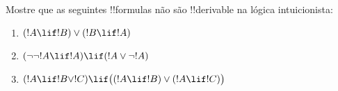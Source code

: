 \documentclass[../../../include/open-logic-section]{subfiles}
\begin{document}
\begin{prob}
  Mostre que as seguintes !!{formula}s não são !!{derivable} na lógica
  intuicionista:
  \begin{enumerate}
    \item $(!A \lif !B) \lor (!B \lif !A)$
    \item $(\lnot\lnot !A \lif !A) \lif (!A \lor \lnot !A)$
    \item $(!A \lif !B \lor !C) \lif \bigl((!A \lif !B)\lor(!A \lif !C)\bigr)$
  \end{enumerate}
\end{prob}
\end{document}
